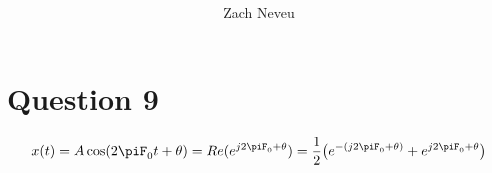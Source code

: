 \documentclass[12pt, letter]{article}
\author{Zach Neveu}
\title{  }
\begin{document}
\maketitle

\section{Question 9}%
\label{sec:question_9}
\[
x(t) = A\cos(2\piF_0t+\theta) = Re(e^{j 2\piF_0+\theta}) = \frac{1}{2}\big(e^{-(j 2\piF_0+\theta)}+e^{j 2\piF_0+\theta}\big)
\] 
\end{document}
